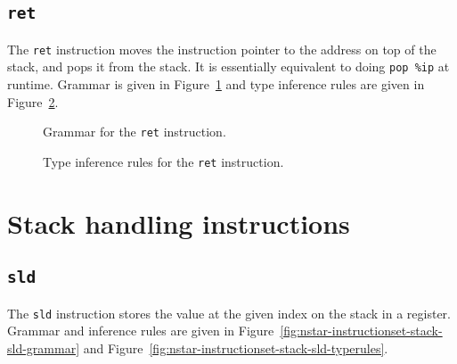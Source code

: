 \subsection{\texttt{ret}}\label{sec:nstar-instructionset-terminal-ret}

The \texttt{ret} instruction moves the instruction pointer to the address on top of the stack, and pops it from the stack.
It is essentially equivalent to doing \texttt{pop \%ip} at runtime.
Grammar is given in Figure~\ref{fig:nstar-instructionset-terminal-ret-grammar} and type inference rules are given in Figure~\ref{fig:nstar-instructionset-terminal-ret-typerules}.

\begin{figure}[H]
  \centering


  \caption{Grammar for the \texttt{ret} instruction.}
  \label{fig:nstar-instructionset-terminal-ret-grammar}
\end{figure}

\begin{figure}[H]
  \centering


  \caption{Type inference rules for the \texttt{ret} instruction.}
  \label{fig:nstar-instructionset-terminal-ret-typerules}
\end{figure}

\section{Stack handling instructions}\label{sec:nstar-instructionset-stack}

\subsection{\texttt{sld}}\label{subsec:nstar-instructionset-stack-sld}

The \texttt{sld} instruction stores the value at the given index on the stack in a register.
Grammar and inference rules are given in Figure~\ref{fig:nstar-instructionset-stack-sld-grammar} and Figure~\ref{fig:nstar-instructionset-stack-sld-typerules}.

